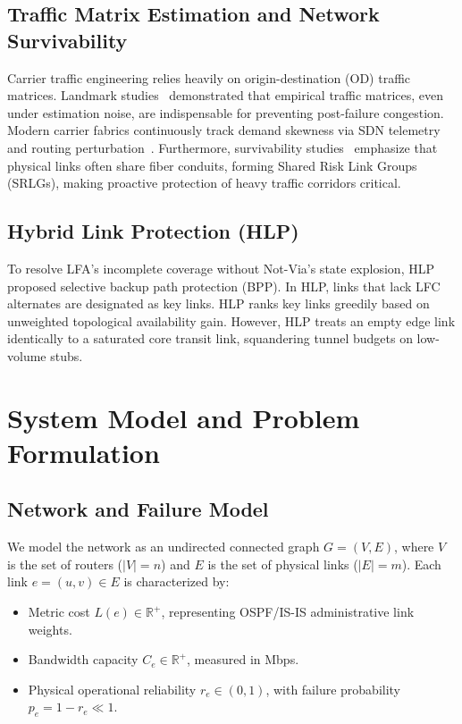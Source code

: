 \documentclass[journal]{IEEEtran}
\begin{document}
\subsection{Traffic Matrix Estimation and Network Survivability}
Carrier traffic engineering relies heavily on origin-destination (OD) traffic matrices. Landmark studies~\cite{feldmann2001deriving,roughan2003traffic,medina2002traffic} demonstrated that empirical traffic matrices, even under estimation noise, are indispensable for preventing post-failure congestion. Modern carrier fabrics continuously track demand skewness via SDN telemetry and routing perturbation~\cite{schlinker2017engineering,polverini2018routing}. Furthermore, survivability studies~\cite{ergenc2021service} emphasize that physical links often share fiber conduits, forming Shared Risk Link Groups (SRLGs), making proactive protection of heavy traffic corridors critical.

\subsection{Hybrid Link Protection (HLP)}
To resolve LFA's incomplete coverage without Not-Via's state explosion, HLP~\cite{geng2020hybrid} proposed selective backup path protection (BPP). In HLP, links that lack LFC alternates are designated as key links. HLP ranks key links greedily based on unweighted topological availability gain. However, HLP treats an empty edge link identically to a saturated core transit link, squandering tunnel budgets on low-volume stubs.

\section{System Model and Problem Formulation}

\subsection{Network and Failure Model}
We model the network as an undirected connected graph $G = (V, E)$, where $V$ is the set of routers ($|V| = n$) and $E$ is the set of physical links ($|E| = m$). Each link $e = (u, v) \in E$ is characterized by:
\begin{itemize}
    \item Metric cost $L(e) \in \mathbb{R}^+$, representing OSPF/IS-IS administrative link weights.
    \item Bandwidth capacity $C_e \in \mathbb{R}^+$, measured in Mbps.
    \item Physical operational reliability $r_e \in (0, 1)$, with failure probability $p_e = 1 - r_e \ll 1$.
\end{itemize}
\end{document}

